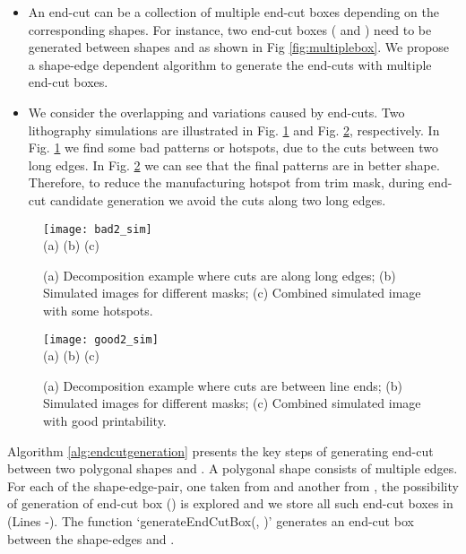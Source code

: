 \documentclass[12pt]{spieman}
\theoremstyle{plain}
\begin{document}
\begin{spacing}{1}
\begin{itemize}
  \item
An end-cut can be a collection of multiple end-cut boxes depending on the corresponding shapes.
For instance, two end-cut boxes ( and ) need to be generated between shapes  and  as shown in Fig \ref{fig:multiplebox}.
We propose a shape-edge dependent algorithm to generate the end-cuts with multiple end-cut boxes.
  \item
We consider the overlapping and variations caused by end-cuts.
Two lithography simulations are illustrated in Fig. \ref{fig:bad2_sim} and Fig. \ref{fig:good2_sim}, respectively.
In Fig. \ref{fig:bad2_sim} we find some bad patterns or hotspots, due to the cuts between two long edges.
In Fig. \ref{fig:good2_sim} we can see that the final patterns are in better shape. 
Therefore, to reduce the manufacturing hotspot from trim mask, during end-cut candidate generation we avoid the cuts along two long edges.
\end{itemize}

\begin{figure}[htb]
  \centering
  \texttt{[image: bad2\_sim]}
  \\ (a) \hspace{4.0cm} (b) \hspace{4.0cm} (c)
  \caption{
  (a) Decomposition example where cuts are along long edges;
  (b) Simulated images for different masks;
  (c) Combined simulated image with some hotspots.
  }
  \label{fig:bad2_sim}
\end{figure}

\begin{figure}[htb]
  \centering
  \texttt{[image: good2\_sim]}
  \\ (a) \hspace{4.0cm} (b) \hspace{4.0cm} (c)
  \caption{
  (a) Decomposition example where cuts are between line ends;
  (b) Simulated images for different masks;
  (c) Combined simulated image with good printability.
  }
  \label{fig:good2_sim}
\end{figure}


Algorithm \ref{alg:endcutgeneration} presents the key steps of generating end-cut between two polygonal shapes  and .
A polygonal shape consists of multiple edges. For each of the shape-edge-pair, one taken from  and another from ,
the possibility of generation of end-cut box () is explored and we store all such end-cut boxes in  (Lines -).
The function `generateEndCutBox(, )' generates an end-cut box  between the shape-edges  and . 


\end{spacing}
\end{document}
